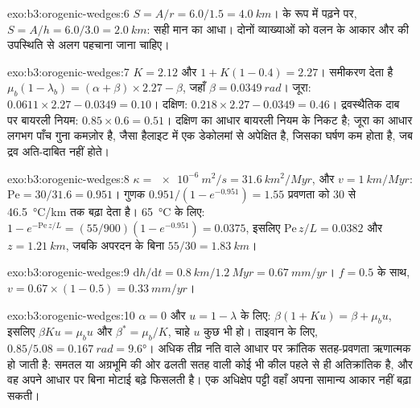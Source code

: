\begin{solution}{exo:b3:orogenic-wedges:6}
$S = A/r = 6.0/1.5 = \qty{4.0}{km}$।  के रूप में पढ़ने पर, $S = A/h =
6.0/3.0 = \qty{2.0}{km}$: सही मान का आधा। दोनों व्याख्याओं को
वलन के आकार और  की उपस्थिति से अलग पहचाना जाना चाहिए।
\end{solution}

\begin{solution}{exo:b3:orogenic-wedges:7}
$K = 2.12$ और $1 + K(1 - 0.4) = 2.27$। समीकरण देता है $\mu_b(1 -
\lambda_b) = (\alpha + \beta)\times2.27 - \beta$, जहाँ $\beta =
\qty{0.0349}{rad}$। जूरा: $0.0611\times2.27 - 0.0349 = 0.10$। दक्षिण:
$0.218\times2.27 - 0.0349 = 0.46$। द्रवस्थैतिक दाब पर बायरली नियम:
$0.85\times0.6 = 0.51$। दक्षिण का आधार बायरली नियम के निकट है;
जूरा का आधार लगभग पाँच गुना कमज़ोर है, जैसा हैलाइट में एक डेकोलमां से
अपेक्षित है, जिसका घर्षण कम होता है, जब द्रव अति-दाबित नहीं होते।
\end{solution}

\begin{solution}{exo:b3:orogenic-wedges:8}
$\kappa = \qty{e-6}{m^2/s} = \qty{31.6}{km^2/Myr}$, और $v =
\qty{1}{km/Myr}$: $\mathrm{Pe} = 30/31.6 = 0.951$। गुणक $0.951/(1 -
e^{-0.951}) = 1.55$ प्रवणता को 30 से \qty{46.5}{\celsius/km} तक बढ़ा देता है।
\qty{65}{\celsius} के लिए: $1 - e^{-\mathrm{Pe}\,z/L} = (55/900)(1 - e^{-0.951})
= 0.0375$, इसलिए $\mathrm{Pe}\,z/L = 0.0382$ और $z = \qty{1.21}{km}$, जबकि
अपरदन के बिना $55/30 = \qty{1.83}{km}$।
\end{solution}

\begin{solution}{exo:b3:orogenic-wedges:9}
$\mathrm dh/\mathrm dt = \qty{0.8}{km}/\qty{1.2}{Myr} = \qty{0.67}{mm/yr}$।
$f = 0.5$ के साथ, $v = 0.67\times(1 - 0.5) = \qty{0.33}{mm/yr}$।
\end{solution}

\begin{solution}{exo:b3:orogenic-wedges:10}
$\alpha = 0$ और $u = 1 - \lambda$ के लिए: $\beta(1 + Ku) = \beta + \mu_b u$,
इसलिए $\beta Ku = \mu_b u$ और $\beta^* = \mu_b/K$, चाहे $u$ कुछ भी हो। ताइवान के लिए,
$0.85/5.08 = \qty{0.167}{rad} = \ang{9.6}$। अधिक तीव्र नति वाले आधार पर क्रांतिक
सतह-प्रवणता ऋणात्मक हो जाती है: समतल या अग्रभूमि की ओर ढलती सतह वाली कोई भी कील
पहले से ही अतिक्रांतिक है, और वह अपने आधार पर बिना मोटाई बढ़े फिसलती है। एक
अधिक्षेप पट्टी वहाँ अपना सामान्य आकार नहीं बढ़ा सकती।
\end{solution}

